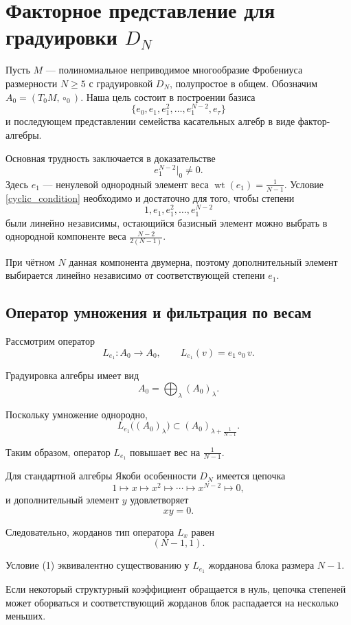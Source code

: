 \section{Факторное представление для градуировки $D_N$}

Пусть $M$ --- полиномиальное неприводимое многообразие Фробениуса
размерности $N\geq 5$ с градуировкой $D_N$,
полупростое в общем.
Обозначим \(A_0=(T_0M,\circ_0).\)
Наша цель состоит в построении базиса
\[\{e_0,e_1,e_1^2,\ldots,e_1^{N-2},e_\tau\}\]
и последующем представлении семейства касательных
алгебр в виде фактор-алгебры.

Основная трудность заключается в доказательстве
\begin{equation}
e_1^{N-2}\big|_0\neq 0.
\label{cyclic_condition}
\end{equation}
Здесь $e_1$ --- ненулевой однородный элемент веса \(\operatorname{wt}(e_1)=\frac{1}{N-1}.\)
Условие \ref{cyclic_condition} необходимо и достаточно для того,
чтобы степени
\[1,e_1,e_1^2,\ldots,e_1^{N-2}\]
были линейно независимы, остающийся базисный элемент можно выбрать в
однородной компоненте веса
\(\frac{N-2}{2(N-1)}.\)

При чётном $N$ данная компонента двумерна,
поэтому дополнительный элемент выбирается
линейно независимо от соответствующей степени
$e_1$.
\iffalse
\subsection{Оператор умножения и фильтрация по весам}

Рассмотрим оператор
\[
L_{e_1}:A_0\longrightarrow A_0,
\qquad
L_{e_1}(v)=e_1\circ_0 v.
\]

Градуировка алгебры имеет вид
\[
A_0=\bigoplus_\lambda (A_0)_\lambda.
\]

Поскольку умножение однородно,
\[
L_{e_1}\bigl((A_0)_\lambda\bigr)
\subset
(A_0)_{\lambda+\frac{1}{N-1}}.
\]

Таким образом, оператор $L_{e_1}$ повышает
вес на $\frac{1}{N-1}$.

Для стандартной алгебры Якоби особенности $D_N$
имеется цепочка
\[
1\longmapsto x\longmapsto x^2
\longmapsto\cdots\longmapsto x^{N-2}
\longmapsto 0,
\]
и дополнительный элемент $y$ удовлетворяет
\[
xy=0.
\]

Следовательно, жорданов тип оператора $L_x$
равен
\[
\boxed{(N-1,1).}
\]

Условие (1) эквивалентно существованию у
$L_{e_1}$ жорданова блока размера $N-1$.

Если некоторый структурный коэффициент
обращается в нуль, цепочка степеней
может оборваться и соответствующий жорданов
блок распадается на несколько меньших.

